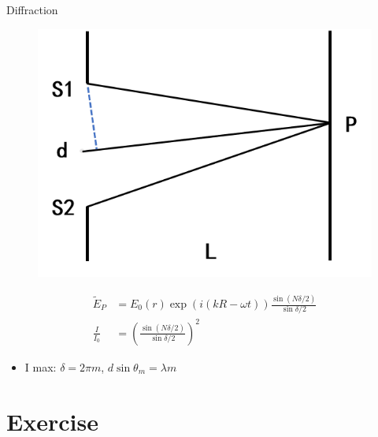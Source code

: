 \documentclass{beamer}
\begin{document}
\begin{frame}{Diffraction}
    \begin{figure}[htbp]
        \centering
        \includegraphics[scale=0.4]{images/diffraction.png}
    \end{figure} 
    
    \begin{equation}
        \begin{split}
            \tilde{E}_P &= E_0(r) \exp(i(kR-\omega t))\frac{\sin(N\delta/2)}{\sin\delta/2} \\
            \frac{I}{I_0} &= \left( \frac{\sin(N\delta/2)}{\sin\delta/2} \right)^2 
        \end{split}      
    \end{equation}

    \begin{itemize}
        \item I max: $\delta=2\pi m$, $d\sin\theta_m=\lambda m$
    \end{itemize}
\end{frame}


\section{Exercise}
\end{document}
